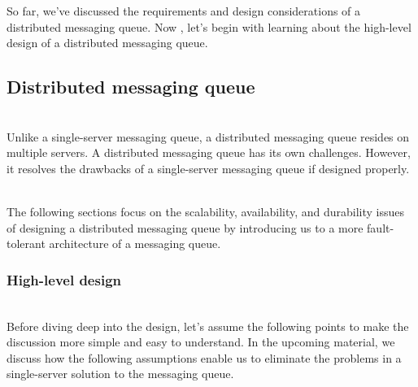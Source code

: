 

So far, we've discussed the requirements and design considerations of a distributed messaging queue. Now , let's begin with learning about the high-level design of a distributed messaging queue.

\subsection{Distributed messaging queue}\label{cVs9CHmu_02fDJDr3TrXK}
\\
Unlike a single-server messaging queue, a distributed messaging queue resides on multiple servers. A distributed messaging queue has its own challenges. However, it resolves the drawbacks of a single-server messaging queue if designed properly.\\
\strut \\
The following sections focus on the scalability, availability, and durability issues of designing a distributed messaging queue by introducing us to a more fault-tolerant architecture of a messaging queue.\\

\subsubsection{High-level design}\label{BUL_3j01HlttPPyStyVfT}
\\
Before diving deep into the design, let's assume the following points to make the discussion more simple and easy to understand. In the upcoming material, we discuss how the following assumptions enable us to eliminate the problems in a single-server solution to the messaging queue.

